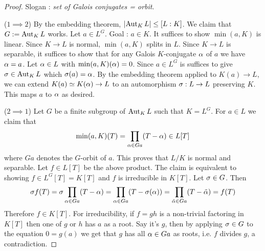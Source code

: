 \documentclass{article}
\begin{document}
\begin{proof}
  Slogan : \emph{set of Galois conjugates = orbit}.

  ($1 \implies 2$)
  By the embedding theorem, $\left\vert \operatorname{Aut}_K L \right\vert \leq [L : K]$.
  We claim that $G := \operatorname{Aut}_K L$ works.
  Let $a \in L^G$. Goal : $a \in K$.
  It suffices to show $\min(a , K)$ is linear.
  Since $K \to L$ is normal, $\min(a, K)$ splits in $L$.
  Since $K \to L$ is separable, it suffices to show that 
  for any Galois $K$-conjugate $\alpha$ of $a$ we have $\alpha = a$.
  Let $\alpha \in L$ with $\min(a , K)(\alpha) = 0$.
  Since $a \in L^G$ is suffices to give $\sigma \in \operatorname{Aut}_K L$
  which $\sigma(a) = \alpha$.
  By the embedding theorem applied to $K(a) \to L$,
  we can extend $K(a) \simeq K(\alpha) \to L$ to an automorphism
  $\sigma : L \to L$ preserving $K$.
  This maps $a$ to $\alpha$ as desired.

  ($2 \implies 1$) Let $G$ be a finite subgroup of $\operatorname{Aut}_K L$
  such that $K = L^G$.
  For $a \in L$ we claim that \[
    \min(a , K)(T) = \prod_{\alpha \in G a} (T - \alpha) \in L[T]
  \]
  where $G a$ denotes the $G$-orbit of $a$.
  This proves that $L/K$ is normal and separable.
  Let $f \in L[T]$ be the above product.
  The claim is equivalent to showing $f \in L^G[T] = K[T]$
  and $f$ is irreducible in $K[T]$.
  Let $\sigma \in G$. Then \[
    \sigma f (T) = \sigma \prod_{\alpha \in G a} (T - \alpha)
    = \prod_{\alpha \in G a} (T - \sigma(\alpha))
    = \prod_{\tilde{\alpha} \in G a} (T - \tilde{\alpha})
    = f(T)
  \]
  Therefore $f \in K[T]$.
  For irreducibility, if $f = g h$ is a non-trivial factoring in $K[T]$
  then one of $g$ or $h$ has $a$ as a root.
  Say it's $g$, then by applying $\sigma \in G$ to the equation $0 = g(a)$
  we get that $g$ has all $\alpha \in G a$ as roots,
  i.e. $f$ divides $g$, a contradiction.


\end{proof}
\end{document}
